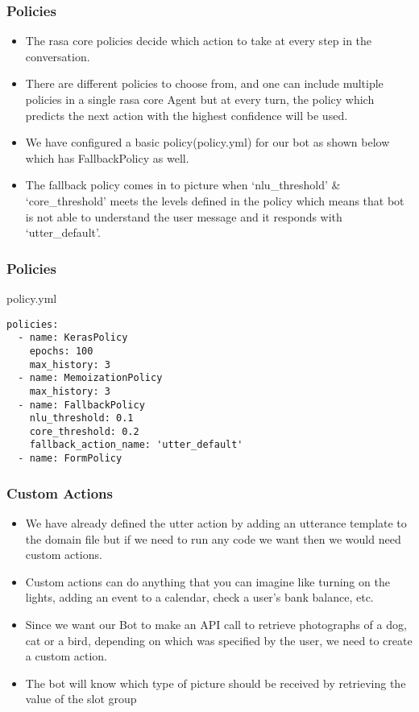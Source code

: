  \begin{frame}[fragile]\frametitle{Policies}

\begin{itemize}
\item The rasa core policies decide which action to take at every step in the conversation. 
\item There are different policies to choose from, and one can include multiple policies in a single rasa core Agent but at every turn, the policy which predicts the next action with the highest confidence will be used. 
\item We have configured a basic policy(policy.yml) for our bot as shown below which has FallbackPolicy as well. 
\item The fallback policy comes in to picture when ‘nlu\_threshold’ \& ‘core\_threshold’ meets the levels defined in the policy which means that bot is not able to understand the user message and it responds with ‘utter\_default’.
\end{itemize}
\end{frame}

 \begin{frame}[fragile]\frametitle{Policies}

 policy.yml
 
 
\begin{lstlisting}
policies:
  - name: KerasPolicy
    epochs: 100
    max_history: 3
  - name: MemoizationPolicy
    max_history: 3
  - name: FallbackPolicy
    nlu_threshold: 0.1
    core_threshold: 0.2
    fallback_action_name: 'utter_default'
  - name: FormPolicy
\end{lstlisting}

\end{frame}

 \begin{frame}[fragile]\frametitle{Custom Actions}

  
\begin{itemize}
\item We have already defined the utter action by adding an utterance template to the domain file but if we need to run any code we want then we would need custom actions. 
\item Custom actions can do anything that you can imagine like turning on the lights, adding an event to a calendar, check a user’s bank balance, etc.
\item Since we want our Bot to make an API call to retrieve photographs of a dog, cat or a bird, depending on which was specified by the user, we need to create a custom action. 
\item The bot will know which type of picture should be received by retrieving the value of the slot group
\end{itemize}

\end{frame}

